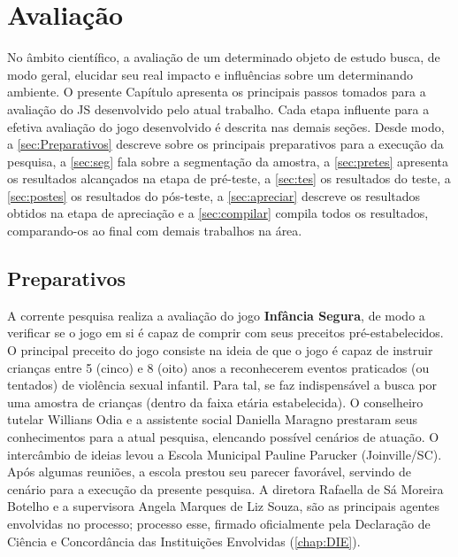 \chapter{Avaliação}\label{ch:Avaliacao}

No âmbito científico, a avaliação de um determinado objeto de estudo busca, de modo geral, elucidar seu real impacto e influências sobre um determinando ambiente. O presente Capítulo apresenta os principais passos tomados para a avaliação do \acf{JS} desenvolvido pelo atual trabalho. Cada etapa influente para a efetiva avaliação do jogo desenvolvido é descrita nas demais seções. Desde modo, a \autoref{sec:Preparativos} descreve sobre os principais preparativos para a execução da pesquisa, a \autoref{sec:seg} fala sobre a segmentação da amostra, a \autoref{sec:pretes} apresenta os resultados alcançados na etapa de pré-teste, a \autoref{sec:tes} os resultados do teste, a \autoref{sec:postes} os resultados do pós-teste, a \autoref{sec:apreciar} descreve os resultados obtidos na etapa de apreciação e a \autoref{sec:compilar} compila todos os resultados, comparando-os ao final com demais trabalhos na área. 

\section{Preparativos}\label{sec:Preparativos}

A corrente pesquisa realiza a avaliação do jogo \textbf{Infância Segura}, de modo a verificar se o jogo em si é capaz de comprir com seus preceitos pré-estabelecidos. O principal preceito do jogo consiste na ideia de que o jogo é capaz de instruir crianças entre 5 (cinco) e 8 (oito) anos a reconhecerem eventos praticados (ou tentados) de violência sexual infantil. Para tal, se faz indispensável a busca por uma amostra de crianças (dentro da faixa etária estabelecida). O conselheiro tutelar Willians Odia e a assistente social Daniella Maragno prestaram seus conhecimentos para a atual pesquisa, elencando possível cenários de atuação. O intercâmbio de ideias levou a Escola Municipal Pauline Parucker (Joinville/\ac{SC}). Após algumas reuniões, a escola prestou seu parecer favorável, servindo de cenário para a execução da presente pesquisa. A diretora Rafaella de Sá Moreira Botelho e a supervisora Angela Marques de Liz Souza, são as principais agentes envolvidas no processo; processo esse, firmado oficialmente pela Declaração de Ciência e Concordância das Instituições Envolvidas (\autoref{chap:DIE}). 

